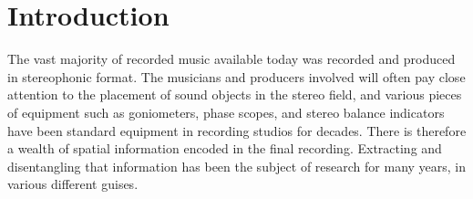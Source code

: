 \documentclass[twoside,a4paper]{article}
\title{\papertitle}
\newif\ifpdf
\begin{document}
\ifpdf %
  \DeclareGraphicsExtensions{.png,.jpg,.pdf}
\else  %
\fi


\maketitle

\begin{abstract}
Estimations of panning attributes are an important feature to extract from a piece of recorded music, with downstream uses such as classification, quality assessment, and listening enhancement. While several algorithms exist in the literature, there is currently no comparison between them and no studies to suggest which one is most suitable for any particular task. This paper compares four algorithms for extracting amplitude panning features with respect to their suitability for unsupervised learning. It finds synchronicities between them and analyses their results on a small set of commercial music excerpts chosen for their distinct panning features. The ability of each algorithm to differentiate between the tracks is analysed. The results can be used in future work to either select the most appropriate panning feature algorithm or create a version customized for a particular task.
\end{abstract}

\section{Introduction}
\label{sec:intro}
The vast majority of recorded music available today was recorded and produced in stereophonic format. The musicians and producers involved will often pay close attention to the placement of sound objects in the stereo field, and various pieces of equipment such as goniometers, phase scopes, and stereo balance indicators have been standard equipment in recording studios for decades. There is therefore a wealth of spatial information encoded in the final recording. Extracting and disentangling that information has been the subject of research for many years, in various different guises. 
\end{document}
